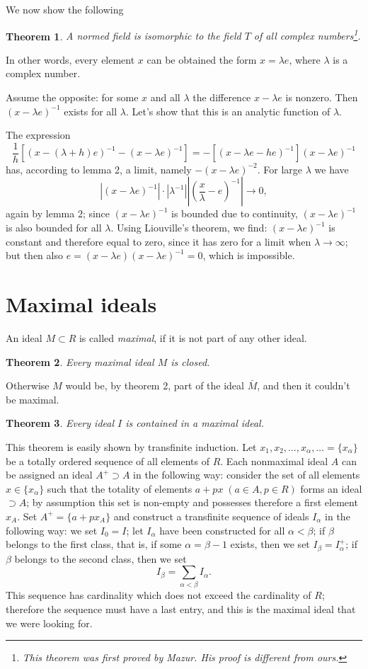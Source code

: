 \documentclass{article}
\newtheorem{theorem}{Theorem}
\theoremstyle{definition}
\begin{document}
We now show the following
\begin{theorem}
  A normed field is isomorphic to the field $T$ of all complex numbers\footnote{This theorem was first proved by Mazur. His proof is different from ours.}.
\end{theorem}

In other words, every element $x$ can be obtained the form $x=\lambda e$, where $\lambda$ is a complex number.

Assume the opposite: for some $x$ and all $\lambda$ the difference $x-\lambda e$ is nonzero. Then $(x-\lambda e)^{-1}$ exists for all $\lambda$. Let's show that this is an analytic function of $\lambda$.

The expression
$$ \frac1h[(x-(\lambda+h)e)^{-1}-(x-\lambda e)^{-1}] = -[(x-\lambda e-he)^{-1}](x-\lambda e)^{-1} $$
has, according to lemma 2, a limit, namely $-(x-\lambda e)^{-2}$. For large $\lambda$ we have
$$ |(x-\lambda e)^{-1}|\cdot|\lambda^{-1}|\left|\left(\frac{x}\lambda-e\right)^{-1}\right| \to 0, $$
again by lemma 2; since $(x-\lambda e)^{-1}$ is bounded due to continuity, $(x-\lambda e)^{-1}$ is also bounded for all $\lambda$. Using Liouville's theorem, we find: $(x-\lambda e)^{-1}$ is constant and therefore equal to zero, since it has zero for a limit when $\lambda\to\infty$; but then also $e=(x-\lambda e)(x-\lambda e)^{-1}=0$, which is impossible.

\section{Maximal ideals}
An ideal $M\subset R$ is called \emph{maximal}, if it is not part of any other ideal.

\begin{theorem}
  Every maximal ideal $M$ is closed.
\end{theorem}

Otherwise $M$ would be, by theorem 2, part of the ideal $\bar{M}$, and then it couldn't be maximal.

\begin{theorem}
  Every ideal $I$ is contained in a maximal ideal.
\end{theorem}

This theorem is easily shown by transfinite induction. Let $x_1, x_2, \dots, x_\alpha, \dots = \{x_\alpha\}$ be a totally ordered sequence of all elements of $R$. Each nonmaximal ideal $A$ can be assigned an ideal $A^+\supset A$ in the following way: consider the set of all elements $x\in\{x_\alpha\}$ such that the totality of elements $a+px\;(a\in A, p\in R)$ forms an ideal $\supset A$; by assumption this set is non-empty and possesses therefore a first element $x_A$. Set $A^+ = \{a+px_A\}$ and construct a transfinite sequence of ideals $I_\alpha$ in the following way: we set $I_0=I$; let $I_\alpha$ have been constructed for all $\alpha < \beta$; if $\beta$ belongs to the first class, that is, if some $\alpha=\beta-1$ exists, then we set $I_\beta = I_\alpha^+$; if $\beta$ belongs to the second class, then we set $$I_\beta = \sum_{\alpha < \beta} I_\alpha.$$ This sequence has cardinality which does not exceed the cardinality of $R$; therefore the sequence must have a last entry, and this is the maximal ideal that we were looking for.
\end{document}
